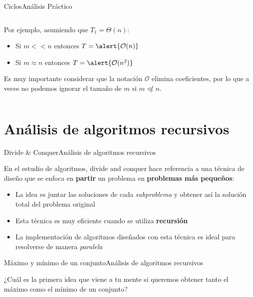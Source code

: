 \documentclass[spanish, c]{beamer}
\newcommand{\bigO}{\mathcal{O}}
\begin{document}
\begin{frame}{Ciclos}{Análisis Práctico}
\begin{columns}
\begin{column}{0.65\textwidth}
            \bigskip

            Por ejemplo, asumiendo que $T_1 = \Theta(n)$:
            
            \begin{itemize}
                \item Si $m << n$ entonces $T = \alert{\bigO(n)}$
                \item Si $m \approx n$ entonces $T = \alert{\bigO(n^2)}$
            \end{itemize}

            Es muy importante considerar que la notación $\bigO$ elimina coeficientes, por lo que a veces no podemos ignorar el tamaño de $m$ si $m \not \ll n$.
        \end{column}
    \end{columns}
\end{frame}

\section{Análisis de algoritmos recursivos}

\begin{frame}{Divide \& Conquer}{Análisis de algoritmos recursivos}

    En el estudio de algoritmos, \alert{divide and conquer} hace referencia a una técnica de diseño que se enfoca en \textbf{partir} un problema en \textbf{problemas más pequeños}: \pause

    \bigskip

    \begin{itemize}[<+->]
        \itemsep2.5ex
        \item La idea es juntar las soluciones de cada \textit{subproblema} y obtener así la solución total del problema original
        \item Esta técnica es muy eficiente cuando se utiliza \textbf{recursión}
        \item La implementación de algoritmos diseñados con esta técnica es ideal para resolverse de manera \textit{paralela}
    \end{itemize}
\end{frame}

\begin{frame}{Máximo y mínimo de un conjunto}{Análisis de algoritmos recursivos}

    \begin{center}
        \huge
        ¿Cuál es la primera idea que viene a tu mente si queremos obtener tanto el máximo como el mínimo de un conjunto?
    \end{center}
    
\end{frame}
\end{document}
